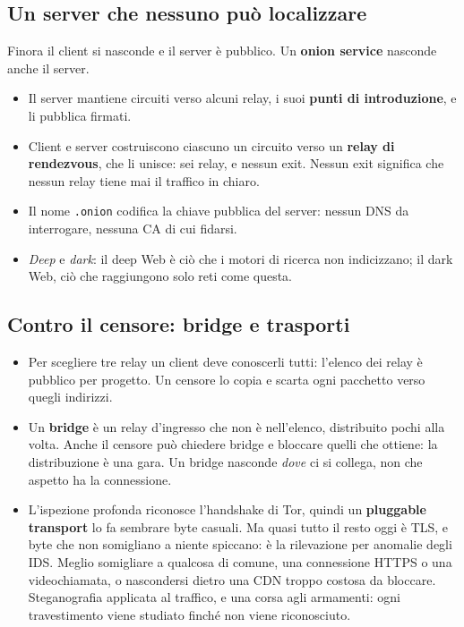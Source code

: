 \subsection{Un server che nessuno può localizzare}

Finora il client si nasconde e il server è pubblico. Un \textbf{onion service} nasconde anche il server.

\begin{itemize}
    \item Il server mantiene circuiti verso alcuni relay, i suoi \textbf{punti di introduzione}, e li pubblica firmati.
    \item Client e server costruiscono ciascuno un circuito verso un \textbf{relay di rendezvous}, che li unisce: sei relay, e nessun exit.
          Nessun exit significa che nessun relay tiene mai il traffico in chiaro.
    \item Il nome \texttt{.onion} codifica la chiave pubblica del server: nessun DNS da interrogare, nessuna CA di cui fidarsi.
    \item \emph{Deep} e \emph{dark}: il deep Web è ciò che i motori di ricerca non indicizzano; il dark Web, ciò che raggiungono solo reti
          come questa.
\end{itemize}

\subsection{Contro il censore: bridge e trasporti}

\begin{itemize}
    \item Per scegliere tre relay un client deve conoscerli tutti: l'elenco dei relay è pubblico per progetto. Un censore lo copia e scarta
          ogni pacchetto verso quegli indirizzi.
    \item Un \textbf{bridge} è un relay d'ingresso che non è nell'elenco, distribuito pochi alla volta. Anche il censore può chiedere bridge
          e bloccare quelli che ottiene: la distribuzione è una gara. Un bridge nasconde \emph{dove} ci si collega, non che aspetto ha la
          connessione.
    \item L'ispezione profonda riconosce l'handshake di Tor, quindi un \textbf{pluggable transport} lo fa sembrare byte casuali. Ma quasi
          tutto il resto oggi è TLS, e byte che non somigliano a niente spiccano: è la rilevazione per anomalie degli IDS. Meglio somigliare a
          qualcosa di comune, una connessione HTTPS o una videochiamata, o nascondersi dietro una CDN troppo costosa da bloccare.
          Steganografia applicata al traffico, e una corsa agli armamenti: ogni travestimento viene studiato finché non viene riconosciuto.
\end{itemize}

